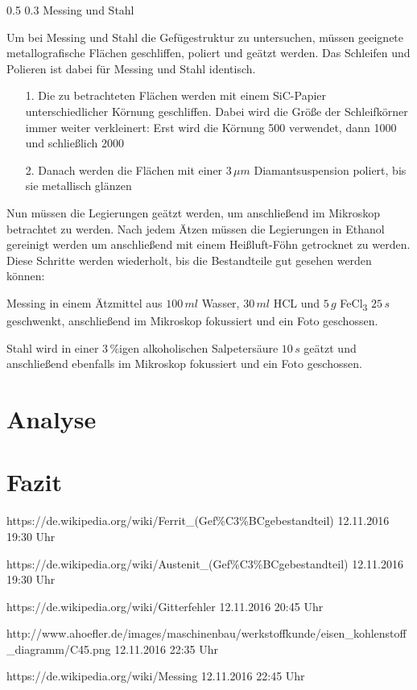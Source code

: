 \documentclass[german, %
parskip=full, %
bibliography=totoc, %
]{scrartcl}
\makeatletter
\renewcommand\subsection{\@startsection 
   {subsection}{2}{0mm}%
   {0.5\baselineskip}%
   {0.3\baselineskip}%
   {\bfseries\sffamily\large}%
   }
\makeatother
\begin{document}
\subsection{Messing und Stahl}

Um bei Messing und Stahl die Gefügestruktur zu untersuchen, müssen geeignete metallografische Flächen geschliffen, poliert und geätzt werden. Das Schleifen und Polieren ist dabei für Messing und Stahl identisch. 

\begin{itemize}
\item[1.] Die zu betrachteten Flächen werden mit einem SiC-Papier unterschiedlicher Körnung geschliffen. Dabei wird die Größe der Schleifkörner immer weiter verkleinert: Erst wird die Körnung 500 verwendet, dann 1000 und schließlich 2000
\item[2.] Danach werden die Flächen mit einer $3\,\mu m$ Diamantsuspension poliert, bis sie metallisch glänzen
\end{itemize}

Nun müssen die Legierungen geätzt werden, um anschließend im Mikroskop betrachtet zu werden. Nach jedem Ätzen müssen die Legierungen in Ethanol gereinigt werden um anschließend mit einem Heißluft-Föhn getrocknet zu werden. Diese Schritte werden wiederholt, bis die Bestandteile gut gesehen werden können:

Messing in einem Ätzmittel aus $100\,ml$ Wasser, $30\,ml$ HCL und $5\,g$ FeCl\textsubscript{3} $25\,s$ geschwenkt, anschließend im Mikroskop fokussiert und ein Foto geschossen.

Stahl wird in einer $3\,\%$igen alkoholischen Salpetersäure $10\,s$ geätzt und anschließend ebenfalls im Mikroskop fokussiert und ein Foto geschossen.

\section{Analyse}



\section{Fazit}




\begin{thebibliography}{9}

  https://de.wikipedia.org/wiki/Ferrit\_(Gef\%C3\%BCgebestandteil)
	12.11.2016
	19:30 Uhr
	
  https://de.wikipedia.org/wiki/Austenit\_(Gef\%C3\%BCgebestandteil)
	12.11.2016
	19:30 Uhr
	
  https://de.wikipedia.org/wiki/Gitterfehler
	12.11.2016
	20:45 Uhr	
	
  http://www.ahoefler.de/images/maschinenbau/werkstoffkunde/eisen\_kohlenstoff\_diagramm/C45.png
	12.11.2016
	22:35 Uhr	
	
  https://de.wikipedia.org/wiki/Messing
	12.11.2016
	22:45 Uhr	

\end{thebibliography}
\end{document}
